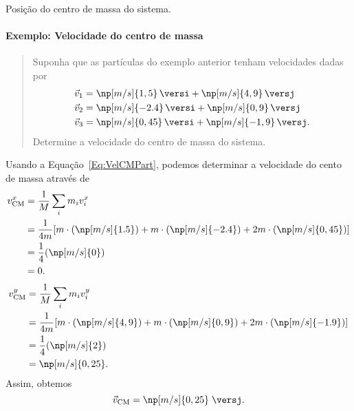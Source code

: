 \begin{marginfigure}[-2cm]
\centering
{}
\caption{Posição do centro de massa do sistema.\label{Fig:Ex:CM3Particulas_2}}
\end{marginfigure}

\paragraph{Exemplo: Velocidade do centro de massa}

\begin{quote}
    Suponha que as partículas do exemplo anterior tenham velocidades dadas por
    \begin{align}
        \vec{v}_1 &= \np[m/s]{1,5} \, \versi + \np[m/s]{4,9} \, \versj \\
        \vec{v}_2 &= \np[m/s]{-2.4} \, \versi + \np[m/s]{0,9} \, \versj \\
        \vec{v}_3 &= \np[m/s]{0,45} \, \versi + \np[m/s]{-1,9} \, \versj.
    \end{align}
Determine a velocidade do centro de massa do sistema.
\end{quote}

Usando a Equação~\ref{Eq:VelCMPart}, podemos determinar a velocidade do cento de massa através de
\begin{align}
    v^x_{\rm{CM}} &= \frac{1}{M} \sum_{i} m_i v^x_i \\
    &= \frac{1}{4m} [m\cdot(\np[m/s]{1.5}) + m\cdot(\np[m/s]{-2.4}) + 2m\cdot(\np[m/s]{0,45})] \\
    &= \frac{1}{4} (\np[m/s]{0}) \\
    &= 0.
\end{align}
%
\begin{align}
    v^y_{\rm{CM}} &= \frac{1}{M} \sum_{i} m_i v^y_i \\
    &= \frac{1}{4m} [m\cdot(\np[m/s]{4,9}) + m\cdot(\np[m/s]{0,9}) + 2m\cdot(\np[m/s]{-1.9})] \\
    &= \frac{1}{4} (\np[m/s]{2}) \\
    &= \np[m/s]{0,25}.
\end{align}
%
Assim, obtemos
\begin{equation}
    \vec{v}_{\text{CM}} = \np[m/s]{0,25} \; \versj.
\end{equation}

